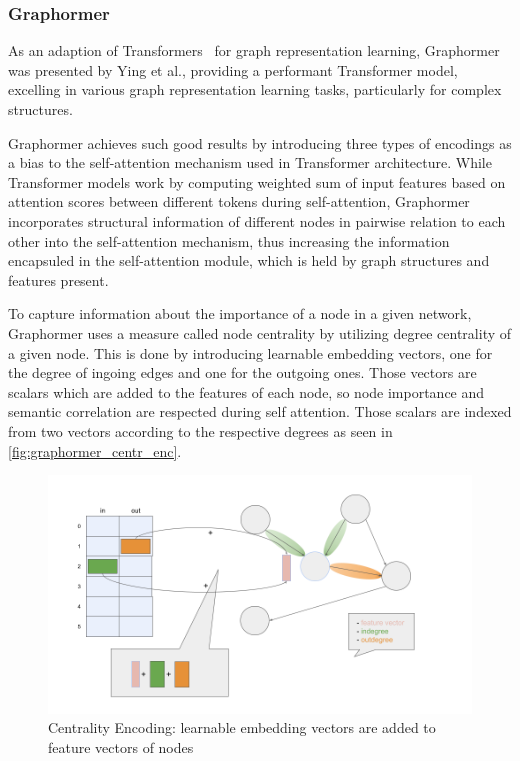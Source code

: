 \subsubsection{Graphormer}
As an adaption of Transformers~\cite{vaswani2017attention} for graph representation learning, Graphormer~\cite{2021graphormer} was presented by Ying et al., providing a performant Transformer model, excelling in various graph representation learning tasks, particularly for complex structures.

Graphormer achieves such good results by introducing three types of encodings as a bias to the self-attention mechanism used in Transformer architecture. While Transformer models work by computing weighted sum of input features based on attention scores between different tokens during self-attention, Graphormer incorporates structural information of different nodes in pairwise relation to each other into the self-attention mechanism, thus increasing the information encapsuled in the self-attention module, which is held by graph structures and features present.

To capture information about the importance of a node in a given network, Graphormer uses a measure called node centrality by utilizing degree centrality of a given node. This is done by introducing learnable embedding vectors, one for the degree of ingoing edges and one for the outgoing ones. Those vectors are scalars which are added to the features of each node, so node importance and semantic correlation are respected during self attention. Those scalars are indexed from two vectors according to the respective degrees as seen in \autoref{fig:graphormer_centr_enc}.

\begin{figure}[ht!]
    \centering
    \includegraphics[scale=0.35]{tex/res/graphormer_centr_enc.png}
    \caption{Centrality Encoding: learnable embedding vectors are added to feature vectors of nodes}
    \label{fig:graphormer_centr_enc}
\end{figure}

